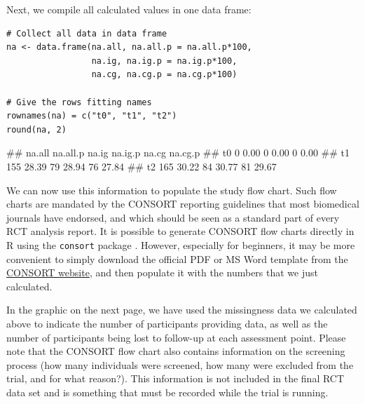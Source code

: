 Next, we compile all calculated values in one data frame:

\begin{lstlisting}
# Collect all data in data frame
na <- data.frame(na.all, na.all.p = na.all.p*100,
                 na.ig, na.ig.p = na.ig.p*100,
                 na.cg, na.cg.p = na.cg.p*100)

# Give the rows fitting names
rownames(na) = c("t0", "t1", "t2")
round(na, 2)
\end{lstlisting}
\begin{example}
##    na.all na.all.p na.ig na.ig.p na.cg na.cg.p
## t0      0     0.00     0    0.00     0    0.00
## t1    155    28.39    79   28.94    76   27.84
## t2    165    30.22    84   30.77    81   29.67
\end{example}


We can now use this information to populate the study flow chart. Such flow charts are mandated by the CONSORT reporting guidelines that most biomedical journals have endorsed, and which should be seen as a standard part of every RCT analysis report. It is possible to generate CONSORT flow charts directly in \textsf{R} using the \texttt{consort} package \citep{consort}. However, especially for beginners, it may be more convenient to simply download the official PDF or MS Word template from the \href{https://www.consort-statement.org/}{CONSORT website}, and then populate it with the numbers that we just calculated.

In the graphic on the next page, we have used the missingness data we calculated above to indicate the number of participants providing data, as well as the number of participants being lost to follow-up at each assessment point. Please note that the CONSORT flow chart also contains information on the screening process (how many individuals were screened, how many were excluded from the trial, and for what reason?). This information is not included in the final RCT data set and is something that must be recorded while the trial is running. 

